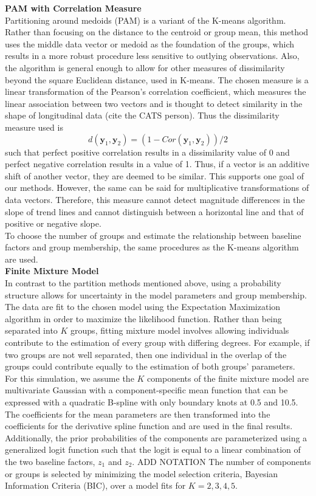\documentclass[12pt]{article}
\newcommand{\B}[0]{\mathbf}
\begin{document}
\textbf{PAM with Correlation Measure}\\
Partitioning around medoids (PAM) is a variant of the K-means algorithm. Rather than focusing on the distance to the centroid or group mean, this method uses the middle data vector or medoid as the foundation of the groups, which results in a more robust procedure less sensitive to outlying observations. Also, the algorithm is general enough to allow for other measures of dissimilarity beyond the square Euclidean distance, used in K-means. The chosen measure is a linear transformation of the Pearson's correlation coefficient, which measures the linear association between two vectors and is thought to detect similarity in the shape of longitudinal data (cite the CATS person). Thus the dissimilarity measure used is
$$d(\B y_{1},\B y_{2}) = (1-Cor(\B y_{1},\B y_{2}))/2$$
such that perfect positive correlation results in a dissimilarity value of 0 and perfect negative correlation results in a value of 1. Thus, if a vector is an additive shift of another vector, they are deemed to be similar. This supports one goal of our methods. However, the same can be said for multiplicative transformations of data vectors. Therefore, this measure cannot detect magnitude differences in the slope of trend lines and cannot distinguish between a horizontal line and that of positive or negative slope.\\
To choose the number of groups and estimate the relationship between baseline factors and group membership, the same procedures as the K-means algorithm are used.\\

\noindent \textbf{Finite Mixture Model}\\
In contrast to the partition methods mentioned above, using a probability structure allows for uncertainty in the model parameters and group membership. The data are fit to the chosen model using the Expectation Maximization algorithm in order to maximize the likelihood function. Rather than being separated into $K$ groups, fitting mixture model involves allowing individuals contribute to the estimation of every group with differing degrees. For example, if two groups are not well separated, then one individual in the overlap of the groups could contribute equally to the estimation of both groups' parameters. \\
For this simulation, we assume the $K$ components of the finite mixture model are multivariate Gaussian with a component-specific mean function that can be expressed with a quadratic B-spline with only boundary knots at 0.5 and 10.5. The coefficients for the mean parameters are then transformed into the coefficients for the derivative spline function and are used in the final results. Additionally, the prior probabilities of the components are parameterized using a generalized logit function such that the logit is equal to a linear combination of the two baseline factors, $z_{1}$ and $z_{2}$. ADD NOTATION The number of components or groups is selected by minimizing the model selection criteria, Bayesian Information Criteria (BIC), over a model fits for $K=2,3,4,5$. \\ 
\end{document}

